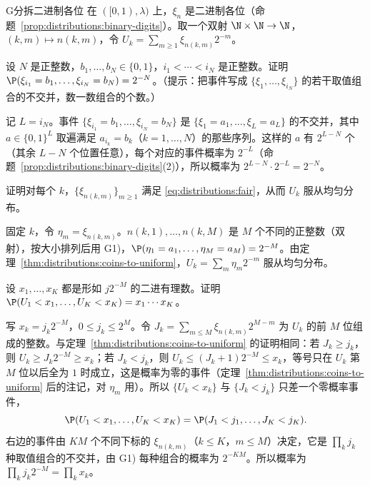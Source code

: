 
\begin{probleme}{G}{分拆二进制各位}
在 $([0,1),\lambda)$ 上，$\xi_n$ 是二进制各位（命题~\ref{prop:distributions:binary-digits}）。取一个双射 $\N\times\N\to\N$，$(k,m)\mapsto n(k,m)$，令 $U_k=\sum_{m\geqslant1}\xi_{n(k,m)}2^{-m}$。
\begin{questions}
\item 设 $N$ 是正整数，$b_1,\dots,b_N\in\{0,1\}$，$i_1<\cdots<i_N$ 是正整数。证明 $\P(\xi_{i_1}=b_1,\dots,\xi_{i_N}=b_N)=2^{-N}$。（提示：把事件写成 $\{\xi_1,\dots,\xi_{i_N}\}$ 的若干取值组合的不交并，数一数组合的个数。）
\begin{solution}
记 $L=i_N$。事件 $\{\xi_{i_1}=b_1,\dots,\xi_{i_N}=b_N\}$ 是 $\{\xi_1=a_1,\dots,\xi_L=a_L\}$ 的不交并，其中 $a\in\{0,1\}^L$ 取遍满足 $a_{i_k}=b_k$（$k=1,\dots,N$）的那些序列。这样的 $a$ 有 $2^{L-N}$ 个（其余 $L-N$ 个位置任意），每个对应的事件概率为 $2^{-L}$（命题~\ref{prop:distributions:binary-digits}(2)），所以概率为 $2^{L-N}\cdot2^{-L}=2^{-N}$。
\end{solution}
\item 证明对每个 $k$，$\{\xi_{n(k,m)}\}_{m\geqslant1}$ 满足 \eqref{eq:distributions:fair}，从而 $U_k$ 服从均匀分布。
\begin{solution}
固定 $k$，令 $\eta_m=\xi_{n(k,m)}$。$n(k,1),\dots,n(k,M)$ 是 $M$ 个不同的正整数（双射），按大小排列后用 G1)，$\P(\eta_1=a_1,\dots,\eta_M=a_M)=2^{-M}$。由定理~\ref{thm:distributions:coins-to-uniform}，$U_k=\sum_m\eta_m2^{-m}$ 服从均匀分布。
\end{solution}
\item 设 $x_1,\dots,x_K$ 都是形如 $j2^{-M}$ 的二进有理数。证明 $\P(U_1<x_1,\dots,U_K<x_K)=x_1\cdots x_K$。
\begin{solution}
写 $x_k=j_k2^{-M}$，$0\leqslant j_k\leqslant2^M$。令 $J_k=\sum_{m\leqslant M}\xi_{n(k,m)}2^{M-m}$ 为 $U_k$ 的前 $M$ 位组成的整数。与定理~\ref{thm:distributions:coins-to-uniform} 的证明相同：若 $J_k\geqslant j_k$，则 $U_k\geqslant J_k2^{-M}\geqslant x_k$；若 $J_k<j_k$，则 $U_k\leqslant(J_k+1)2^{-M}\leqslant x_k$，等号只在 $U_k$ 第 $M$ 位以后全为 $1$ 时成立，这是概率为零的事件（定理~\ref{thm:distributions:coins-to-uniform} 后的注记，对 $\eta_m$ 用）。所以 $\{U_k<x_k\}$ 与 $\{J_k<j_k\}$ 只差一个零概率事件，
\[
\P(U_1<x_1,\dots,U_K<x_K)=\P(J_1<j_1,\dots,J_K<j_K).
\]
右边的事件由 $KM$ 个不同下标的 $\xi_{n(k,m)}$（$k\leqslant K$，$m\leqslant M$）决定，它是 $\prod_kj_k$ 种取值组合的不交并，由 G1) 每种组合的概率为 $2^{-KM}$。所以概率为 $\prod_kj_k2^{-M}=\prod_kx_k$。

\end{solution}
\end{questions}
\end{probleme}
